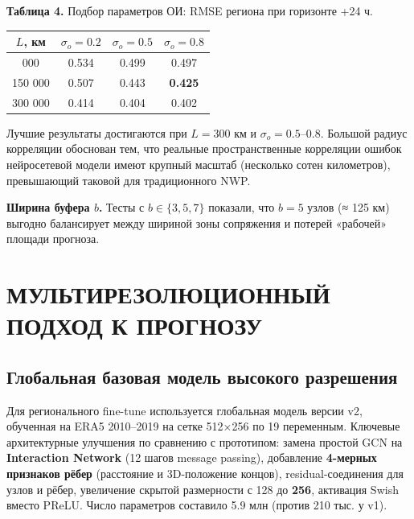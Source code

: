 \documentclass[14pt,a4paper]{extarticle}
\newcounter{none}
\numberwithin{table}{section}
\numberwithin{figure}{section}
\numberwithin{equation}{section}
\begin{document}
\textbf{Таблица 4.} Подбор параметров ОИ: RMSE региона при горизонте +24
ч.

{\def\LTcaptype{none} %
\begin{longtable}[]{@{}cccc@{}}
\toprule\noalign{}
\(L\), км & \(\sigma_o = 0.2\) & \(\sigma_o = 0.5\) &
\(\sigma_o = 0.8\) \\
\midrule\noalign{}
\endhead
\bottomrule\noalign{}
\endlastfoot
50 000 & 0.534 & 0.499 & 0.497 \\
150 000 & 0.507 & 0.443 & \textbf{0.425} \\
300 000 & 0.414 & 0.404 & 0.402 \\
\end{longtable}
}

Лучшие результаты достигаются при \(L = 300\) км и
\(\sigma_o = 0.5\)--\(0.8\). Большой радиус корреляции обоснован тем,
что реальные пространственные корреляции ошибок нейросетевой модели
имеют крупный масштаб (несколько сотен километров), превышающий таковой
для традиционного NWP.

\textbf{Ширина буфера \(b\).} Тесты с \(b \in \{3, 5, 7\}\) показали,
что \(b = 5\) узлов (≈ 125 км) выгодно балансирует между шириной зоны
сопряжения и потерей «рабочей» площади прогноза.


\newpage

\section{МУЛЬТИРЕЗОЛЮЦИОННЫЙ ПОДХОД К ПРОГНОЗУ}\label{ux43cux443ux43bux44cux442ux438ux440ux435ux437ux43eux43bux44eux446ux438ux43eux43dux43dux44bux439-ux43fux43eux434ux445ux43eux434-ux43a-ux43fux440ux43eux433ux43dux43eux437ux443}

\subsection{Глобальная базовая модель высокого разрешения}\label{ux433ux43bux43eux431ux430ux43bux44cux43dux430ux44f-ux431ux430ux437ux43eux432ux430ux44f-ux43cux43eux434ux435ux43bux44c-ux432ux44bux441ux43eux43aux43eux433ux43e-ux440ux430ux437ux440ux435ux448ux435ux43dux438ux44f}

Для регионального fine-tune используется глобальная модель версии v2,
обученная на ERA5 2010--2019 на сетке 512×256 по 19 переменным. Ключевые
архитектурные улучшения по сравнению с прототипом: замена простой GCN на
\textbf{Interaction Network} (12 шагов message passing), добавление
\textbf{4-мерных признаков рёбер} (расстояние и 3D-положение концов),
residual-соединения для узлов и рёбер, увеличение скрытой размерности с
128 до \textbf{256}, активация Swish вместо PReLU. Число параметров
составило 5.9 млн (против 210 тыс. у v1).
\end{document}
